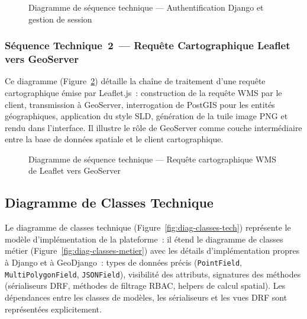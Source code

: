 \begin{figure}[H]
  \centering
  \caption{Diagramme de séquence technique --- Authentification Django et gestion de session}
  \label{fig:seq-tech1}
\end{figure}

\subsubsection{Séquence Technique~2~--- Requête Cartographique Leaflet vers GeoServer}

Ce diagramme (Figure~\ref{fig:seq-tech2}) détaille la chaîne de traitement
d'une requête cartographique émise par Leaflet.js~: construction de la
requête WMS par le client, transmission à GeoServer, interrogation de
PostGIS pour les entités géographiques, application du style SLD, génération
de la tuile image PNG et rendu dans l'interface. Il illustre le rôle de
GeoServer comme couche intermédiaire entre la base de données spatiale et
le client cartographique.

\begin{figure}[H]
  \centering
  \caption{Diagramme de séquence technique --- Requête cartographique WMS de Leaflet vers GeoServer}
  \label{fig:seq-tech2}
\end{figure}

\subsection{Diagramme de Classes Technique}
\label{ssec:classes-tech}

Le diagramme de classes technique (Figure~\ref{fig:diag-classes-tech})
représente le modèle d'implémentation de la plateforme~: il étend le
diagramme de classes métier (Figure~\ref{fig:diag-classes-metier}) avec
les détails d'implémentation propres à Django et à GeoDjango~:
types de données précis (\texttt{PointField}, \texttt{MultiPolygonField},
\texttt{JSONField}), visibilité des attributs, signatures des méthodes
(sérialiseurs DRF, méthodes de filtrage RBAC, helpers de calcul spatial).
Les dépendances entre les classes de modèles, les sérialiseurs et les vues
DRF sont représentées explicitement.

